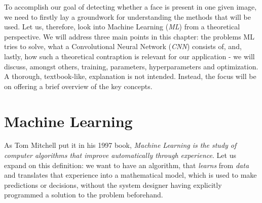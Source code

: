 To accomplish our goal of detecting whether a face is present in one given image, we need to firstly lay a groundwork for understanding the methods that will be used. Let us, therefore, look into Machine Learning (\textit{ML}) from a theoretical perspective. We will address three main points in this chapter: the problems ML tries to solve, what a Convolutional Neural Network (\textit{CNN}) consists of, and, lastly, how such a theoretical contraption is relevant for our application - we will discuss, amongst others, training, parameters, hyperparameters and optimization. A thorough, textbook-like, explanation is not intended. Instead, the focus will be on offering a brief overview of the key concepts.
\section{Machine Learning}
As Tom Mitchell put it in his 1997 book, \textit{Machine Learning is the study of computer algorithms that improve automatically through experience}. \cite{mitchell_ml} Let us expand on this definition: we want to have an algorithm, that \textit{learns} from \textit{data} and translates that experience into a mathematical model, which is used to make predictions or decisions, without the system designer having explicitly programmed a solution to the problem beforehand. \cite{genetic_book_96} \par

